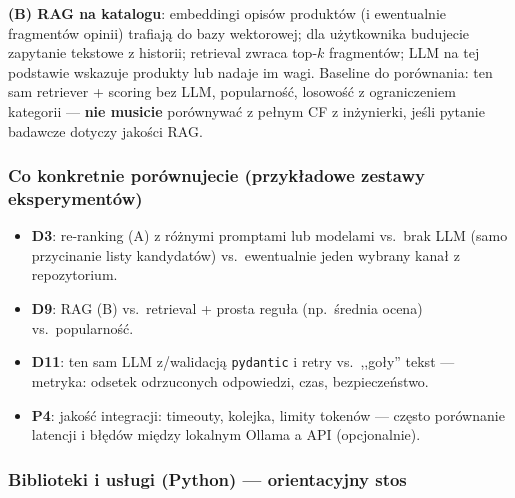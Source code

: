 \documentclass[a4paper,11pt]{article}
\newcommand{\code}[1]{\texttt{\small #1}}
\begin{document}
\textbf{(B) RAG na katalogu}: embeddingi opisów produktów (i ewentualnie fragmentów opinii) trafiają do bazy wektorowej; dla użytkownika budujecie zapytanie tekstowe z historii; retrieval zwraca top-$k$ fragmentów; LLM na tej podstawie wskazuje produkty lub nadaje im wagi. Baseline do porównania: ten sam retriever + scoring bez LLM, popularność, losowość z ograniczeniem kategorii --- \textbf{nie musicie} porównywać z pełnym CF z inżynierki, jeśli pytanie badawcze dotyczy jakości RAG.

\subsubsection{Co konkretnie porównujecie (przykładowe zestawy eksperymentów)}

\begin{itemize}[leftmargin=1.5em,itemsep=2pt]
  \item \textbf{D3}: re-ranking (A) z różnymi promptami lub modelami vs.\ brak LLM (samo przycinanie listy kandydatów) vs.\ ewentualnie jeden wybrany kanał z repozytorium.
  \item \textbf{D9}: RAG (B) vs.\ retrieval + prosta reguła (np.\ średnia ocena) vs.\ popularność.
  \item \textbf{D11}: ten sam LLM z/walidacją \code{pydantic} i retry vs.\ ,,goły'' tekst --- metryka: odsetek odrzuconych odpowiedzi, czas, bezpieczeństwo.
  \item \textbf{P4}: jakość integracji: timeouty, kolejka, limity tokenów --- często porównanie latencji i błędów między lokalnym Ollama a API (opcjonalnie).
\end{itemize}

\subsubsection{Biblioteki i usługi (Python) --- orientacyjny stos}
\end{document}
